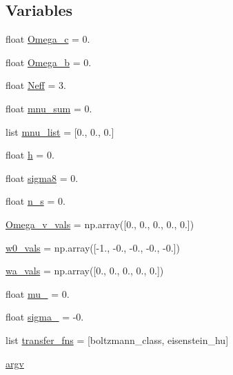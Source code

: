 \subsection*{Variables}
\begin{DoxyCompactItemize}
\item 
float \mbox{\hyperlink{namespaceccl__test__power_aaf9d8b7db6570b06c0f0c3453991271f}{Omega\+\_\+c}} = 0.
\item 
float \mbox{\hyperlink{namespaceccl__test__power_ab5d61f296807cf09df592a9c06f8ec7c}{Omega\+\_\+b}} = 0.
\item 
float \mbox{\hyperlink{namespaceccl__test__power_a6b35ce94d1e19c7a920a69f32a19d220}{Neff}} = 3.
\item 
float \mbox{\hyperlink{namespaceccl__test__power_a8041706a448167dfed239ef392310710}{mnu\+\_\+sum}} = 0.
\item 
list \mbox{\hyperlink{namespaceccl__test__power_abb3b81930a5b96dad621f66bd6931c78}{mnu\+\_\+list}} = \mbox{[}0., 0., 0.\mbox{]}
\item 
float \mbox{\hyperlink{namespaceccl__test__power_a87063e26755d0fd20dc7b85fe40181f7}{h}} = 0.
\item 
float \mbox{\hyperlink{namespaceccl__test__power_a1db9a0e452c2ccc904f3a1828f1143a8}{sigma8}} = 0.
\item 
float \mbox{\hyperlink{namespaceccl__test__power_a506d59dad2f002ac2695a23c3927e746}{n\+\_\+s}} = 0.
\item 
\mbox{\hyperlink{namespaceccl__test__power_a21350279041ff7f791d335e70a395c6d}{Omega\+\_\+v\+\_\+vals}} = np.\+array(\mbox{[}0., 0., 0., 0., 0.\mbox{]})
\item 
\mbox{\hyperlink{namespaceccl__test__power_aea53fa09107f79b1ea572fc722716147}{w0\+\_\+vals}} = np.\+array(\mbox{[}-\/1., -\/0., -\/0., -\/0., -\/0.\mbox{]})
\item 
\mbox{\hyperlink{namespaceccl__test__power_af24a271b345239e7f2d22fd15a615fea}{wa\+\_\+vals}} = np.\+array(\mbox{[}0., 0., 0., 0., 0.\mbox{]})
\item 
float \mbox{\hyperlink{namespaceccl__test__power_aa636b77ad20e41c0d89cd7483070bf57}{mu\+\_}} = 0.
\item 
float \mbox{\hyperlink{namespaceccl__test__power_abe8d1d5ac9e677eea2c65a3b98c75276}{sigma\+\_}} = -\/0.
\item 
list \mbox{\hyperlink{namespaceccl__test__power_a540d8a33297c93fd4d595c7007e5e929}{transfer\+\_\+fns}} = \mbox{[}\textquotesingle{}boltzmann\+\_\+class\textquotesingle{}, \textquotesingle{}eisenstein\+\_\+hu\textquotesingle{}\mbox{]}
\item 
\mbox{\hyperlink{namespaceccl__test__power_a1b5fdf14c4f06d4a8722a7c41d8dbe1a}{argv}}
\end{DoxyCompactItemize}


